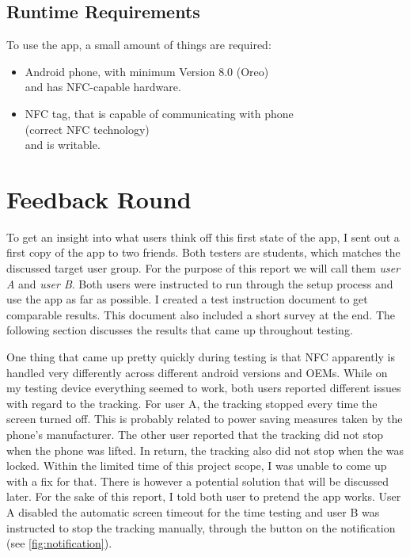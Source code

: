 \documentclass[conference]{IEEEtran}
\begin{document}
\subsection{Runtime Requirements}
To use the app, a small amount of things are required:

\begin{itemize}
	\item Android phone, with minimum Version 8.0 (Oreo)\\
	and has NFC-capable hardware.
	\item NFC tag, that is capable of communicating with phone\\
	(correct NFC technology)\\
	and is writable.
\end{itemize}

\section{Feedback Round}
To get an insight into what users think off this first state of the app, I sent out a first copy of the app to two friends. Both testers are students, which matches the discussed target user group. For the purpose of this report we will call them \textit{user A} and \textit{user B}.
Both users were instructed to run through the setup process and use the app as far as possible. I created a test instruction document to get comparable results. This document also included a short survey at the end. The following section discusses the results that came up throughout testing.

One thing that came up pretty quickly during testing is that NFC apparently is handled very differently across different android versions and OEMs. While on my testing device everything seemed to work, both users reported different issues with regard to the tracking. For user A, the tracking stopped every time the screen turned off. This is probably related to power saving measures taken by the phone's manufacturer. The other user reported that the tracking did not stop when the phone was lifted. In return, the tracking also did not stop when the was locked. Within the limited time of this project scope, I was unable to come up with a fix for that. There is however a potential solution that will be discussed later. For the sake of this report, I told both user to pretend the app works. User A disabled the automatic screen timeout for the time testing and user B was instructed to stop the tracking manually, through the button on the notification (see \cref{fig:notification}).
\end{document}
